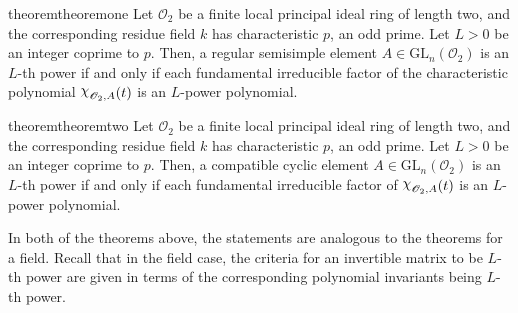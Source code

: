 \documentclass[11pt,twoside]{amsart}
\newcommand{\GL}{\mathrm{GL}}
\newcommand{\upchi}{\raisebox{0.4ex}{$\chi$}}
\newcommand{\Char}{\upchi}
\newcommand{\R}{\mathscr{O}_2}
\theoremstyle{definition} %
\begin{document}
\begin{restatable}{theorem}{theoremone}\label{thm:reg-sem-poly}
Let $\R$ be a finite local principal ideal ring of length two, and the corresponding residue field $k$ has characteristic $p$, an odd prime. Let $L>0$ be an integer coprime to $p$. Then, a regular semisimple element $A\in \GL_n(\R)$ is an $L$-th power if and only if each fundamental irreducible factor of the characteristic polynomial $\Char_{\R, A}(t)$ is an $L$-power polynomial.
\end{restatable}

\begin{restatable}{theorem}{theoremtwo}\label{thm:cyc}
Let $\R$ be a finite local principal ideal ring of length two, and the corresponding residue field $k$ has characteristic $p$, an odd prime.  
Let $L>0$ be an integer coprime to $p$. Then, a compatible cyclic element $A\in \GL_n(\R)$ is an $L$-th power if and only if each fundamental irreducible factor of $\Char_{\R, A}(t)$ is an $L$-power polynomial. 
\end{restatable}
\noindent In both of the theorems above, the statements are analogous to the theorems for a field. Recall that in the field case, the criteria for an invertible matrix to be $L$-th power are given in terms of the corresponding polynomial invariants being $L$-th power.
\end{document}
